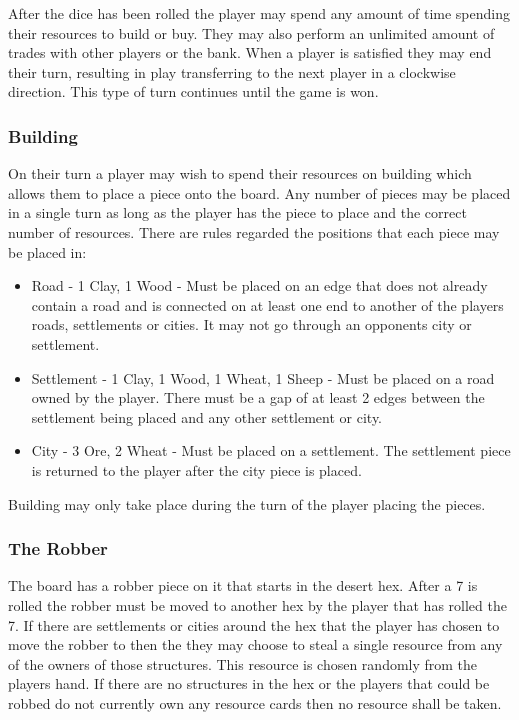 \documentclass[]{article}
\begin{document}
\par After the dice has been rolled the player may spend any amount of time spending their resources to build or buy. They may also perform an unlimited amount of trades with other players or the bank. When a player is satisfied they may end their turn, resulting in play transferring to the next player in a clockwise direction. This type of turn continues until the game is won.

\subsubsection{Building}
On their turn a player may wish to spend their resources on building which allows them to place a piece onto the board. Any number of pieces may be placed in a single turn as long as the player has the piece to place and the correct number of resources. There are rules regarded the positions that each piece may be placed in:

\begin{itemize}
  \item Road - 1 Clay, 1 Wood - Must be placed on an edge that does not already contain a road and is connected on at least one end to another of the players roads, settlements or cities. It may not go through an opponents city or settlement.
  \item Settlement - 1 Clay, 1 Wood, 1 Wheat, 1 Sheep - Must be placed on a road owned by the player. There must be a gap of at least 2 edges between the settlement being placed and any other settlement or city.
  \item City - 3 Ore, 2 Wheat - Must be placed on a settlement. The settlement piece is returned to the player after the city piece is placed.
\end{itemize}

\par Building may only take place during the turn of the player placing the pieces.

\subsubsection{The Robber}
The board has a robber piece on it that starts in the desert hex. After a 7 is rolled the robber must be moved to another hex by the player that has rolled the 7. If there are settlements or cities around the hex that the player has chosen to move the robber to then the they may choose to steal a single resource from any of the owners of those structures. This resource is chosen randomly from the players hand. If there are no structures in the hex or the players that could be robbed do not currently own any resource cards then no resource shall be taken.
\end{document}
